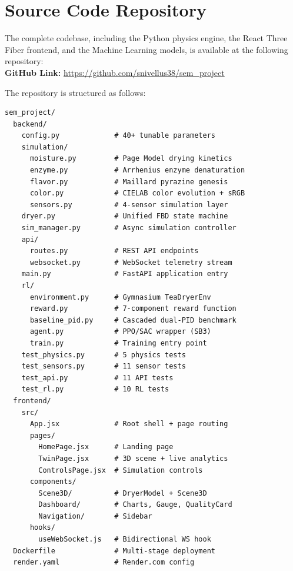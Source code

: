 ﻿\documentclass[12pt, a4paper]{report}
\begin{document}
\appendix

\chapter{Source Code Repository}
The complete codebase, including the Python physics engine, the React Three Fiber frontend, and the Machine Learning models, is available at the following repository:\\[4pt]
\textbf{GitHub Link:} \url{https://github.com/snivellus38/sem_project}

\smallskip\noindent The repository is structured as follows:
\begin{lstlisting}[style=pythonstyle, language={}, basicstyle=\ttfamily\small, numbers=none]
sem_project/
  backend/
    config.py             # 40+ tunable parameters
    simulation/
      moisture.py         # Page Model drying kinetics
      enzyme.py           # Arrhenius enzyme denaturation
      flavor.py           # Maillard pyrazine genesis
      color.py            # CIELAB color evolution + sRGB
      sensors.py          # 4-sensor simulation layer
    dryer.py              # Unified FBD state machine
    sim_manager.py        # Async simulation controller
    api/
      routes.py           # REST API endpoints
      websocket.py        # WebSocket telemetry stream
    main.py               # FastAPI application entry
    rl/
      environment.py      # Gymnasium TeaDryerEnv
      reward.py           # 7-component reward function
      baseline_pid.py     # Cascaded dual-PID benchmark
      agent.py            # PPO/SAC wrapper (SB3)
      train.py            # Training entry point
    test_physics.py       # 5 physics tests
    test_sensors.py       # 11 sensor tests
    test_api.py           # 11 API tests
    test_rl.py            # 10 RL tests
  frontend/
    src/
      App.jsx             # Root shell + page routing
      pages/
        HomePage.jsx      # Landing page
        TwinPage.jsx      # 3D scene + live analytics
        ControlsPage.jsx  # Simulation controls
      components/
        Scene3D/          # DryerModel + Scene3D
        Dashboard/        # Charts, Gauge, QualityCard
        Navigation/       # Sidebar
      hooks/
        useWebSocket.js   # Bidirectional WS hook
  Dockerfile              # Multi-stage deployment
  render.yaml             # Render.com config
\end{lstlisting}
\end{document}
